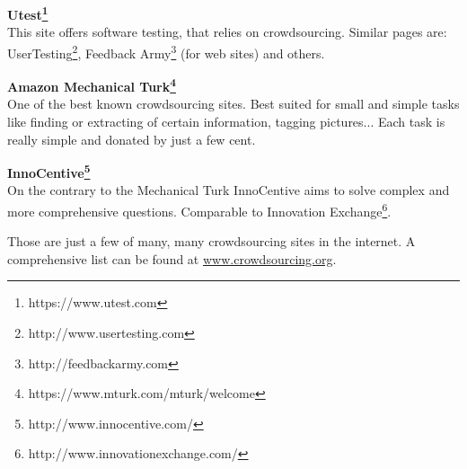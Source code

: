 \documentclass{acm_proc_article-sp}
\begin{document}
\textbf{Utest\footnote{https://www.utest.com}}\\
This site offers software testing, that relies on crowdsourcing. Similar pages are: UserTesting\footnote{http://www.usertesting.com}, Feedback Army\footnote{http://feedbackarmy.com} (for web sites) and others.

\textbf{Amazon Mechanical Turk\footnote{https://www.mturk.com/mturk/welcome}}\\
One of the best known crowdsourcing sites. Best suited for small and simple tasks like finding or extracting of certain information, tagging pictures... Each task is really simple and donated by just a few cent.

\textbf{InnoCentive\footnote{http://www.innocentive.com/}}\\
On the contrary to the Mechanical Turk InnoCentive aims to solve complex and more comprehensive questions. Comparable to Innovation Exchange\footnote{http://www.innovationexchange.com/}.

Those are just a few of many, many crowdsourcing sites in the internet. A comprehensive list can be found at \href{http://www.crowdsourcing.org/directory}{www.crowdsourcing.org}.
\end{document}
